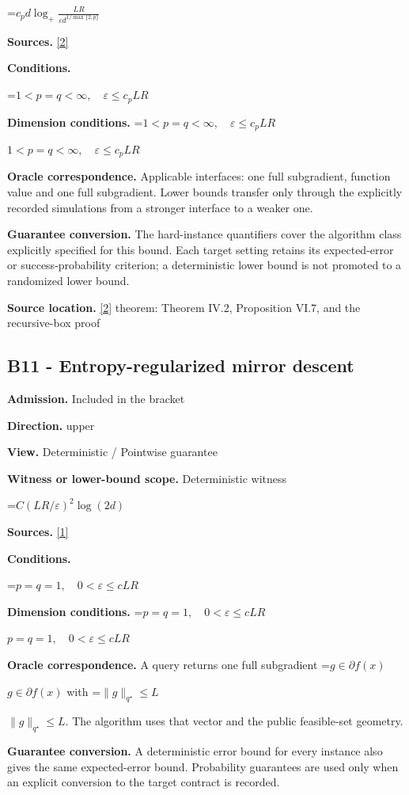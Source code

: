 \documentclass[10pt,a4paper]{article}
\newcommand{\AtlasMath}[1]{\par\begingroup\centering\setbox0=\hbox{$\displaystyle #1$}\ifdim\wd0>1.4\linewidth\typeout{ATLAS WIDE FORMULA: \the\wd0}\fi\ifdim\wd0>\linewidth\resizebox{\linewidth}{!}{\box0}\else\box0\fi\par\endgroup}
\newcommand{\AtlasInlineMath}[1]{\begingroup\setbox0=\hbox{$#1$}\ifdim\wd0>.4\linewidth\endgroup\AtlasMath{#1}\else\endgroup$#1$\fi}
\begin{document}
\AtlasMath{c_p d\log_+\frac{LR}{\varepsilon d^{1/\max\{2,p\}}}}
\textbf{Sources.} \href{https://arxiv.org/pdf/1407.5144}{[2]}

\textbf{Conditions.} 
\AtlasMath{1<p=q<\infty,\quad\varepsilon\le c_p LR}


\textbf{Dimension conditions.} \AtlasInlineMath{1<p=q<\infty,\quad\varepsilon\le c_p LR}

\textbf{Oracle correspondence.} Applicable interfaces: one full subgradient, function value and one full subgradient. Lower bounds transfer only through the explicitly recorded simulations from a stronger interface to a weaker one.

\textbf{Guarantee conversion.} The hard-instance quantifiers cover the algorithm class explicitly specified for this bound. Each target setting retains its expected-error or success-probability criterion; a deterministic lower bound is not promoted to a randomized lower bound.

\textbf{Source location.} \href{https://arxiv.org/pdf/1407.5144}{[2]} theorem: Theorem IV.2, Proposition VI.7, and the recursive-box proof

\subsection{B11 - Entropy-regularized mirror descent}
\textbf{Admission.} Included in the bracket

\textbf{Direction.} upper

\textbf{View.} Deterministic / Pointwise guarantee

\textbf{Witness or lower-bound scope.} Deterministic witness

\AtlasMath{C(LR/\varepsilon)^2\log(2d)}
\textbf{Sources.} \href{https://arxiv.org/pdf/1107.4080}{[1]}

\textbf{Conditions.} 
\AtlasMath{p=q=1,\quad0<\varepsilon\le cLR}


\textbf{Dimension conditions.} \AtlasInlineMath{p=q=1,\quad0<\varepsilon\le cLR}

\textbf{Oracle correspondence.} A query returns one full subgradient \AtlasInlineMath{g\in\partial f(x)} with \AtlasInlineMath{\|g\|_{q^\star}\le L}. The algorithm uses that vector and the public feasible-set geometry.

\textbf{Guarantee conversion.} A deterministic error bound for every instance also gives the same expected-error bound. Probability guarantees are used only when an explicit conversion to the target contract is recorded.
\end{document}
